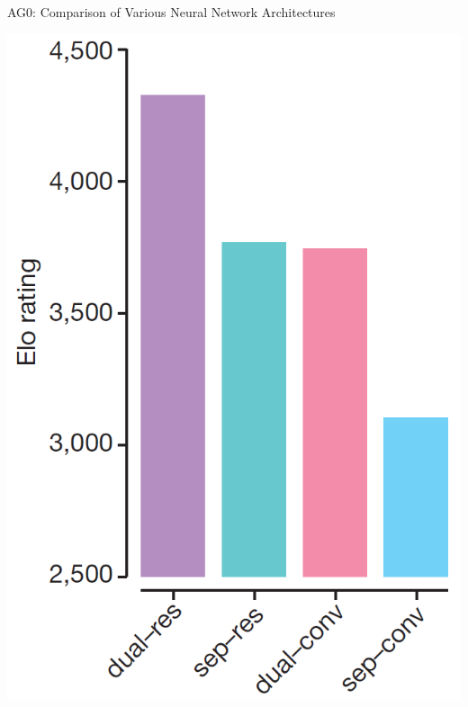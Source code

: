 \documentclass{beamer}
\begin{document}
{    \begin{frame}{AG0: Comparison of Various Neural Network Architectures}
      \begin{center}
        \includegraphics[height=.9\textheight]{../img/AG0-paper/nn-arch-vs-elo.png}
      \end{center}
    \end{frame}

}
\end{document}
